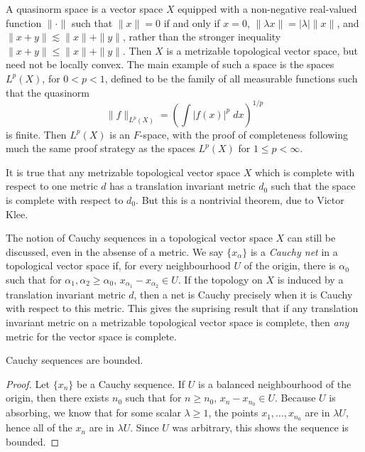 \begin{example}
    A quasinorm space is a vector space $X$ equipped with a non-negative real-valued function $\| \cdot \|$ such that $\| x \| = 0$ if and only if $x = 0$, $\| \lambda x \| = |\lambda| \| x \|$, and $\| x + y \| \lesssim \|x\| + \|y\|$, rather than the stronger inequality $\| x + y \| \leq \| x \| + \| y \|$. Then $X$ is a metrizable topological vector space, but need not be locally convex. The main example of such a space is the spaces $L^p(X)$, for $0 < p < 1$, defined to be the family of all measurable functions such that the quasinorm
    \[ \| f \|_{L^p(X)} = \left( \int |f(x)|^p\; dx \right)^{1/p} \]
    is finite. Then $L^p(X)$ is an $F$-space, with the proof of completeness following much the same proof strategy as the spaces $L^p(X)$ for $1 \leq p < \infty$.
\end{example}

\begin{remark}
    It is true that any metrizable topological vector space $X$ which is complete with respect to one metric $d$ has a translation invariant metric $d_0$ such that the space is complete with respect to $d_0$. But this is a nontrivial theorem, due to Victor Klee.
\end{remark}

The notion of Cauchy sequences in a topological vector space $X$ can still be discussed, even in the absense of a metric. We say $\{ x_\alpha \}$ is a \emph{Cauchy net} in a topological vector space if, for every neighbourhood $U$ of the origin, there is $\alpha_0$ such that for $\alpha_1,\alpha_2 \geq \alpha_0$, $x_{\alpha_1} - x_{\alpha_2} \in U$. If the topology on $X$ is induced by a translation invariant metric $d$, then a net is Cauchy precisely when it is Cauchy with respect to this metric. This gives the suprising result that if any translation invariant metric on a metrizable topological vector space is complete, then \emph{any} metric for the vector space is complete.

\begin{theorem}
    Cauchy sequences are bounded.
\end{theorem}
\begin{proof}
    Let $\{ x_n \}$ be a Cauchy sequence. If $U$ is a balanced neighbourhood of the origin, then there exists $n_0$ such that for $n \geq n_0$, $x_n - x_{n_0} \in U$. Because $U$ is absorbing, we know that for some scalar $\lambda \geq 1$, the points $x_1, \dots, x_{n_0}$ are in $\lambda U$, hence all of the $x_n$ are in $\lambda U$. Since $U$ was arbitrary, this shows the sequence is bounded.
\end{proof}

